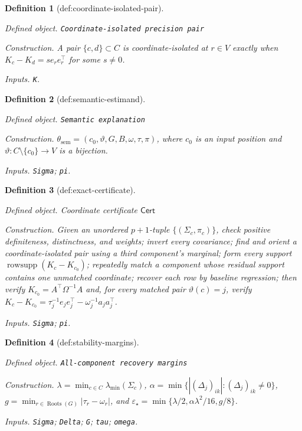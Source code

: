 \documentclass{article}
\newtheorem{definition}{Definition}
\begin{document}
\begin{definition}[def:coordinate-isolated-pair]\label{def:coordinate-isolated-pair}
\par\smallskip\noindent\emph{Defined object.} \texttt{Coordinate-\allowbreak{}isolated precision pair}
\par\smallskip\noindent\emph{Construction.} A pair \(\{c,d\}\subset C\) is coordinate-isolated at \(r\in V\) exactly when \(K_c-K_d=s e_re_r^{\top}\) for some \(s\neq0\).
\par\smallskip\noindent\emph{Inputs.} \texttt{K}.
\end{definition}

\begin{definition}[def:semantic-estimand]\label{def:semantic-estimand}
\par\smallskip\noindent\emph{Defined object.} \texttt{Semantic explanation}
\par\smallskip\noindent\emph{Construction.} \(\theta_{\mathrm{sem}}=(c_0,\vartheta,G,B,\omega,\tau,\pi)\), where \(c_0\) is an input position and \(\vartheta:C\setminus\{c_0\}\to V\) is a bijection.
\par\smallskip\noindent\emph{Inputs.} \texttt{Sigma}; \texttt{pi}.
\end{definition}

\begin{definition}[def:exact-certificate]\label{def:exact-certificate}
\par\smallskip\noindent\emph{Defined object.} Coordinate certificate \(\mathsf{Cert}\)
\par\smallskip\noindent\emph{Construction.} Given an unordered \(p+1\)-tuple \(\{(\Sigma_c,\pi_c)\}\), check positive definiteness, distinctness, and weights; invert every covariance; find and orient a coordinate-isolated pair using a third component's marginal; form every support \(\operatorname{rowsupp}(K_c-K_{c_0})\); repeatedly match a component whose residual support contains one unmatched coordinate; recover each row by baseline regression; then verify \(K_{c_0}=A^{\top}\Omega^{-1}A\) and, for every matched pair \(\vartheta(c)=j\), verify \(K_c-K_{c_0}=\tau_j^{-1}e_je_j^{\top}-\omega_j^{-1}a_ja_j^{\top}\).
\par\smallskip\noindent\emph{Inputs.} \texttt{Sigma}; \texttt{pi}.
\end{definition}

\begin{definition}[def:stability-margins]\label{def:stability-margins}
\par\smallskip\noindent\emph{Defined object.} \texttt{All-\allowbreak{}component recovery margins}
\par\smallskip\noindent\emph{Construction.} \(\lambda=\min_{c\in C}\lambda_{\min}(\Sigma_c)\), \(\alpha=\min\{|(\Delta_j)_{ik}|:(\Delta_j)_{ik}\neq0\}\), \(g=\min_{r\in\operatorname{Roots}(G)}|\tau_r-\omega_r|\), and \(\varepsilon_{\star}=\min\{\lambda/2,\alpha\lambda^2/16,g/8\}\).
\par\smallskip\noindent\emph{Inputs.} \texttt{Sigma}; \texttt{Delta}; \texttt{G}; \texttt{tau}; \texttt{omega}.
\end{definition}
\end{document}

